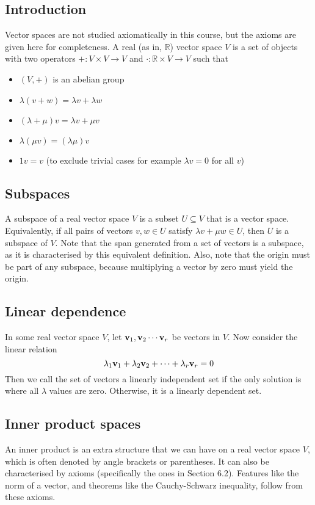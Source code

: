 \subsection{Introduction}
Vector spaces are not studied axiomatically in this course, but the axioms are given here for completeness.
A real (as in, \(\mathbb R\)) vector space \(V\) is a set of objects with two operators \(+: V \times V \to V\) and \(\cdot: \mathbb R \times V \to V\) such that
\begin{itemize}
	\item \((V, +)\) is an abelian group
	\item \(\lambda(v + w) = \lambda v + \lambda w\)
	\item \((\lambda + \mu)v = \lambda v + \mu v\)
	\item \(\lambda(\mu v) = (\lambda \mu) v\)
	\item \(1v = v\) (to exclude trivial cases for example \(\lambda v = 0\) for all \(v\))
\end{itemize}

\subsection{Subspaces}
A subspace of a real vector space \(V\) is a subset \(U \subseteq V\) that is a vector space.
Equivalently, if all pairs of vectors \(v, w \in U\) satisfy \(\lambda v + \mu w \in U\), then \(U\) is a subspace of \(V\).
Note that the span generated from a set of vectors is a subspace, as it is characterised by this equivalent definition.
Also, note that the origin must be part of any subspace, because multiplying a vector by zero must yield the origin.

\subsection{Linear dependence}
In some real vector space \(V\), let \(\vb v_1, \vb v_2 \cdots \vb v_r\) be vectors in \(V\).
Now consider the linear relation
\[
	\lambda_1 \vb v_1 + \lambda_2 \vb v_2 + \cdots + \lambda_r \vb v_r = 0
\]
Then we call the set of vectors a linearly independent set if the only solution is where all \(\lambda\) values are zero.
Otherwise, it is a linearly dependent set.

\subsection{Inner product spaces}
An inner product is an extra structure that we can have on a real vector space \(V\), which is often denoted by angle brackets or parentheses.
It can also be characterised by axioms (specifically the ones in Section 6.2).
Features like the norm of a vector, and theorems like the Cauchy-Schwarz inequality, follow from these axioms.

